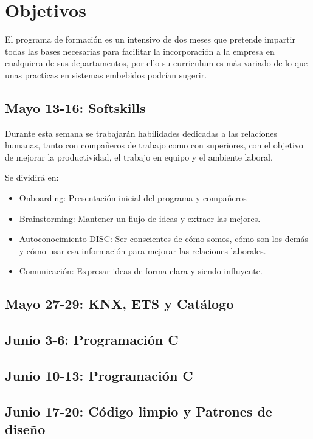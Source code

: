 \chapter{Objetivos}
\label{ch:objetivos}

El programa de formación es un intensivo de dos meses que pretende impartir todas las bases necesarias para facilitar la incorporación a la empresa en cualquiera de sus departamentos, por ello su curriculum es más variado de lo que unas practicas en sistemas embebidos podrían sugerir.

\section*{Mayo 13-16: Softskills}
\label{sec:may13-16}

Durante esta semana se trabajarán habilidades dedicadas a las relaciones humanas, tanto con compañeros de trabajo como con superiores, con el objetivo de mejorar la productividad, el trabajo en equipo y el ambiente laboral.

Se dividirá en:
\begin{itemize}
    \item Onboarding: Presentación inicial del programa y compañeros
    \item Brainstorming: Mantener un flujo de ideas y extraer las mejores.
    \item Autoconocimiento DISC: Ser conscientes de cómo somos, cómo son los demás y cómo usar esa información para mejorar las relaciones laborales.
    \item Comunicación: Expresar ideas de forma clara y siendo influyente.
\end{itemize}

\section*{Mayo 27-29: KNX, ETS y Catálogo}
\label{sec:may27-29}

\section*{Junio 3-6: Programación C}
\label{sec:jun3-6}

\section*{Junio 10-13: Programación C}
\label{sec:jun10-13}

\section*{Junio 17-20: Código limpio y Patrones de diseño}
\label{sec:jun17-20}

